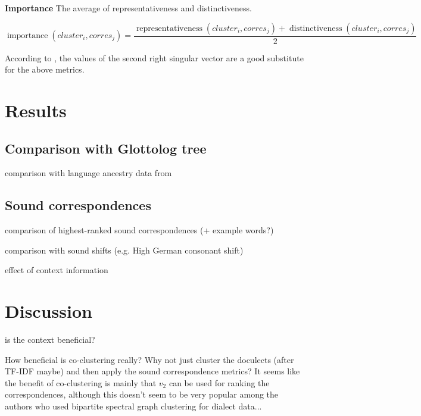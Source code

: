 \documentclass{article}
\begin{document}
\textbf{Importance}
The average of representativeness and distinctiveness.

\begin{equation*}
\operatorname{importance}(cluster_i, corres_j) = 
\frac{\operatorname{representativeness}(cluster_i, corres_j) + \operatorname{distinctiveness}(cluster_i, corres_j)}
{2}
\end{equation*}


According to \cite{wieling2010hierarchical}, the values of the second right singular vector are a good substitute for the above metrics.

\section{Results}

\subsection{Comparison with Glottolog tree}
comparison with language ancestry data from \cite{hammarstrom2018glottolog}

\subsection{Sound correspondences}
comparison of highest-ranked sound correspondences
(+ example words?)

comparison with sound shifts (e.g. High German consonant shift)

effect of context information

\section{Discussion}


is the context beneficial?

How beneficial is co-clustering really? Why not just cluster the doculects (after TF-IDF maybe) and then apply the sound correspondence metrics? It seems like the benefit of co-clustering is mainly that $v_2$ can be used for ranking the correspondences, although this doesn't seem to be very popular among the authors who used bipartite spectral graph clustering for dialect data...
\end{document}

